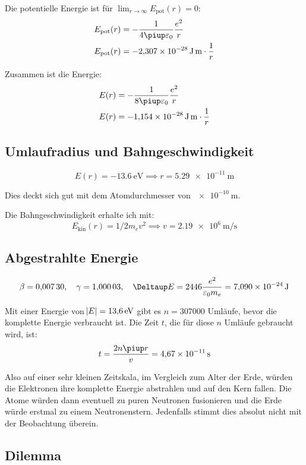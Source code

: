 Die potentielle Energie ist für $\lim_{r \to \infty} E_\text{pot}(r) = 0$:
\begin{align*}
	E_\text{pot}(r) &= - \frac{1}{4 \piup \varepsilon_0} \frac{e^2}{r} \\
	E_\text{pot}(r) &= \SI{-2.307e-28}{\joule\meter} \cdot \frac 1r
\end{align*}

Zusammen ist die Energie:
\begin{align*}
	E(r) &= - \frac{1}{8 \piup \varepsilon_0} \frac{e^2}{r} \\
	E(r) &= \SI{-1.154e-28}{\joule\meter} \cdot \frac 1r
\end{align*}

\subsection{Umlaufradius und Bahngeschwindigkeit}

\[
	E(r) = \SI{-13.6}{\electronvolt}
	\implies
	r = \SI{5.29e-11}{\meter}
\]

Dies deckt sich gut mit dem Atomdurchmesser von $\SI{e-10}{\meter}$.

Die Bahngeschwindigkeit erhalte ich mit:
\[
	E_\text{kin}(r) = 1/2 m_e v^2
	\implies
	v = \SI{2.19e6}{\meter\per\second}
\]

\subsection{Abgestrahlte Energie}

\[
	\beta = \num{0.00730}
	\eqnsep
	\gamma = \num{1.00003}
	\eqnsep
	\Deltaup E = \num{2446} \frac{e^2}{\varepsilon_0 m_e} = \SI{7.090e-24}\joule
\]

Mit einer Energie von $\abs E = \SI{13.6}\electronvolt$ gibt es $n =
\num{307000}$ Umläufe, bevor die komplette Energie verbraucht ist. Die Zeit
$t$, die für diese $n$ Umläufe gebraucht wird, ist:
\[
	t = \frac{2 n \piup r}v = \SI{4.67e-11}\second
\]

Also auf einer sehr kleinen Zeitskala, im Vergleich zum Alter der Erde, würden
die Elektronen ihre komplette Energie abstrahlen und auf den Kern fallen. Die
Atome würden dann eventuell zu puren Neutronen fusionieren und die Erde würde
erstmal zu einem Neutronenstern. Jedenfalls stimmt dies absolut nicht mit der
Beobachtung überein.

\subsection{Dilemma}

